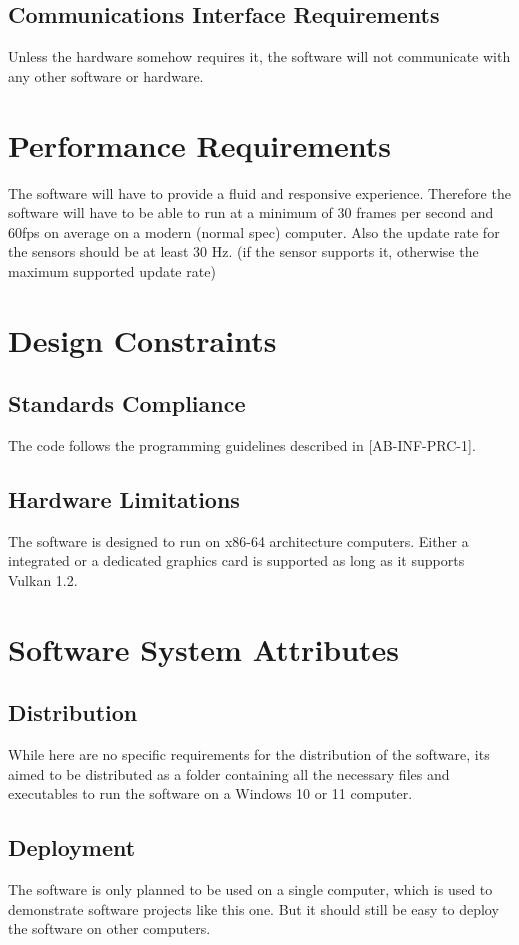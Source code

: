 \documentclass[a4paper]{scrreprt}
\begin{document}
\subsection{Communications Interface Requirements}
Unless the hardware somehow requires it, the software will not communicate with any other software or hardware.

\section{Performance Requirements}
The software will have to provide a fluid and responsive experience.
Therefore the software will have to be able to run at a minimum of 30 frames per second and 60fps on average on a modern (normal spec) computer.
Also the update rate for the sensors should be at least 30 Hz. (if the sensor supports it, otherwise the maximum supported update rate)

\section{Design Constraints}
\subsection{Standards Compliance}
The code follows the programming guidelines described in [AB-INF-PRC-1].

\subsection{Hardware Limitations}
The software is designed to run on x86-64 architecture computers. Either a integrated or a dedicated graphics card is supported as long as it supports Vulkan 1.2.

\section{Software System Attributes}
\subsection{Distribution}
While here are no specific requirements for the distribution 
of the software, its aimed to be distributed as a folder containing 
all the necessary files and executables to run the software 
on a Windows 10 or 11 computer.

\subsection{Deployment}
The software is only planned to be used on a single computer, 
which is used to demonstrate software projects like this one.
But it should still be easy to deploy the software on other computers.
\end{document}
